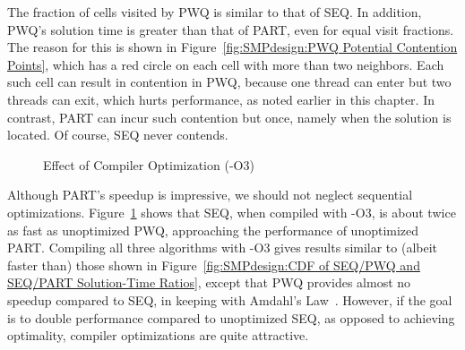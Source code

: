 The fraction of cells visited by PWQ is similar to that of SEQ.
In addition, PWQ's solution time is greater than that of PART,
even for equal visit fractions.
The reason for this is shown in
Figure~\ref{fig:SMPdesign:PWQ Potential Contention Points}, which has a red
circle on each cell with more than two neighbors.
Each such cell can result in contention in PWQ, because
one thread can enter but two threads can exit, which hurts
performance, as noted earlier in this chapter.
In contrast, PART can incur such contention but once, namely
when the solution is located.
Of course, SEQ never contends.

\begin{figure}[tb]
\begin{center}
\end{center}
\caption{Effect of Compiler Optimization (-O3)}
\label{fig:SMPdesign:Effect of Compiler Optimization (-O3)}
\end{figure}

Although PART's speedup is impressive, we should not neglect sequential
optimizations.
Figure~\ref{fig:SMPdesign:Effect of Compiler Optimization (-O3)} shows that
SEQ, when compiled with -O3, is about twice as fast
as unoptimized PWQ, approaching the performance of unoptimized PART.
Compiling all three algorithms with -O3 gives results similar to
(albeit faster than) those shown in
Figure~\ref{fig:SMPdesign:CDF of SEQ/PWQ and SEQ/PART Solution-Time Ratios},
except that PWQ provides almost no speedup compared
to SEQ, in keeping with Amdahl's Law~\cite{GeneAmdahl1967AmdahlsLaw}.
However, if the goal is to double performance compared to unoptimized
SEQ, as opposed to achieving optimality, compiler
optimizations are quite attractive.

